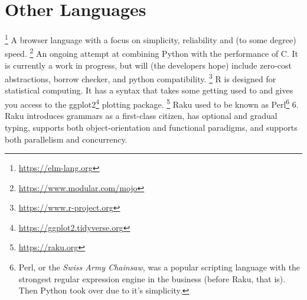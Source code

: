 \section{Other Languages}

\begin{itemize}
  \footnote{\url{https://elm-lang.org}} A  browser language with a focus on simplicity, reliability and (to some degree) speed.
  \footnote{\url{https://www.modular.com/mojo}} An ongoing attempt at combining Python with the performance of C. It is currently a work in progress, but will (the developers hope) include zero-cost abstractions, borrow checker, and python compatibility.
  \footnote{\url{https://www.r-project.org}} R is designed for statistical computing. It has a syntax that takes some getting used to and gives you access to the ggplot2\footnote{\url{https://ggplot2.tidyverse.org}} plotting package.
  \footnote{\url{https://raku.org}} Raku used to be known as Perl\footnote{Perl, or the \textsl{Swiss Army Chainsaw}, was a popular scripting language with the strongest regular expression engine in the business (before Raku, that is). Then Python took over due to it's simplicity.} 6. Raku introduces grammars as a first-class citizen, has optional and gradual typing, supports both object-orientation and functional paradigms, and supports both parallelism and concurrency.
\end{itemize}
